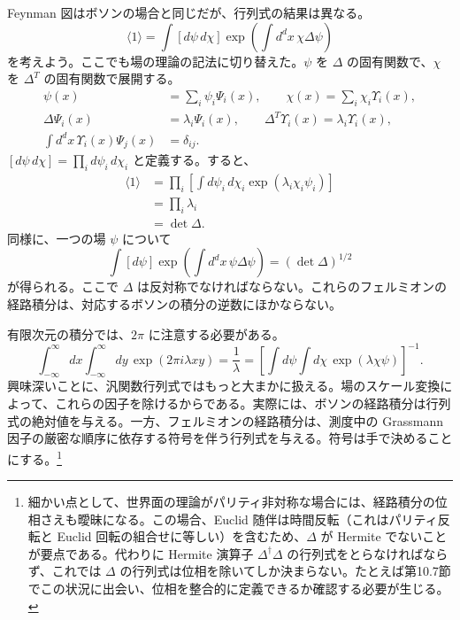 Feynman 図はボソンの場合と同じだが、行列式の結果は異なる。
\begin{equation}
\langle1\rangle
=\int[d\psi\,d\chi]\exp\left(\int d^dx\,\chi\Delta\psi\right)
\tag{A.2.24}\label{eq:A.2.24}
\end{equation}
を考えよう。ここでも場の理論の記法に切り替えた。$\psi$ を $\Delta$ の固有関数で、$\chi$ を $\Delta^T$ の固有関数で展開する。
\begin{align}
\psi(x)&=\sum_i\psi_i\Psi_i(x),\qquad
\chi(x)=\sum_i\chi_i\Upsilon_i(x),
\tag{A.2.25a}\label{eq:A.2.25a}\\
\Delta\Psi_i(x)&=\lambda_i\Psi_i(x),\qquad
\Delta^T\Upsilon_i(x)=\lambda_i\Upsilon_i(x),
\tag{A.2.25b}\label{eq:A.2.25b}\\
\int d^dx\,\Upsilon_i(x)\Psi_j(x)&=\delta_{ij}.
\tag{A.2.25c}\label{eq:A.2.25c}
\end{align}
$[d\psi\,d\chi]=\prod_i d\psi_i\,d\chi_i$ と定義する。すると、
\begin{equation}
\begin{aligned}
\langle1\rangle
&=\prod_i\left[\int d\psi_i\,d\chi_i\exp(\lambda_i\chi_i\psi_i)\right]\\
&=\prod_i\lambda_i\\
&=\det\Delta.
\end{aligned}
\tag{A.2.26}\label{eq:A.2.26}
\end{equation}
同様に、一つの場 $\psi$ について
\begin{equation}
\int[d\psi]\exp\left(\int d^dx\,\psi\Delta\psi\right)
=(\det\Delta)^{1/2}
\tag{A.2.27}\label{eq:A.2.27}
\end{equation}
が得られる。ここで $\Delta$ は反対称でなければならない。これらのフェルミオンの経路積分は、対応するボソンの積分の逆数にほかならない。

有限次元の積分では、$2\pi$ に注意する必要がある。
\begin{equation}
\int_{-\infty}^{\infty}dx\int_{-\infty}^{\infty}dy\,
\exp(2\pi i\lambda xy)
=\frac1\lambda
=\left[\int d\psi\int d\chi\,\exp(\lambda\chi\psi)\right]^{-1}.
\tag{A.2.28}\label{eq:A.2.28}
\end{equation}
興味深いことに、汎関数行列式ではもっと大まかに扱える。場のスケール変換によって、これらの因子を除けるからである。実際には、ボソンの経路積分は行列式の絶対値を与える。一方、フェルミオンの経路積分は、測度中の Grassmann 因子の厳密な順序に依存する符号を伴う行列式を与える。符号は手で決めることにする。\footnote[4]{細かい点として、世界面の理論がパリティ非対称な場合には、経路積分の位相さえも曖昧になる。この場合、Euclid 随伴は時間反転（これはパリティ反転と Euclid 回転の組合せに等しい）を含むため、$\Delta$ が Hermite でないことが要点である。代わりに Hermite 演算子 $\Delta^\dagger\Delta$ の行列式をとらなければならず、これでは $\Delta$ の行列式は位相を除いてしか決まらない。たとえば第10.7節でこの状況に出会い、位相を整合的に定義できるか確認する必要が生じる。}

